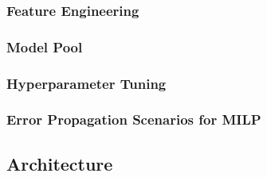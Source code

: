 \subsubsection{Feature Engineering}

\subsubsection{Model Pool}

\subsubsection{Hyperparameter Tuning}

\subsubsection{Error Propagation Scenarios for MILP}

\subsection{Architecture}

\newpage
